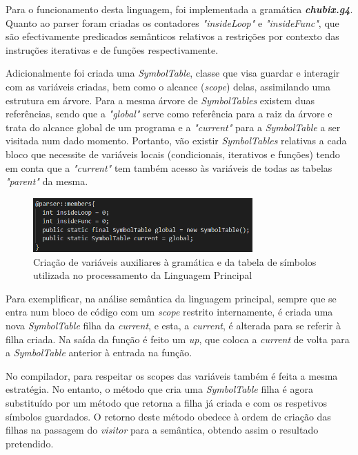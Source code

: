 \documentclass[10pt,portuguese]{article}
\begin{document}
\par Para o funcionamento desta linguagem, foi implementada a gramática \textbf{\textit{chubix.g4}}. Quanto ao parser foram criadas os contadores \emph{"insideLoop"} e \emph{"insideFunc"}, que são efectivamente predicados semânticos relativos a restrições por contexto das instruções iterativas e de funções respectivamente.
\par Adicionalmente foi criada uma \emph{SymbolTable}, classe que visa guardar e interagir com as variáveis criadas, bem como o alcance (\emph{scope}) delas, assimilando uma estrutura em árvore. Para a mesma árvore de \emph{SymbolTables} existem duas referências, sendo que a \emph{"global"} serve como referência para a raiz da árvore e trata do alcance global de um programa e a \emph{"current"} para a \emph{SymbolTable} a ser visitada num dado momento. Portanto, vão existir \emph{SymbolTables} relativas a cada bloco que necessite de variáveis locais (condicionais, iterativos e funções) tendo em conta que a \emph{"current"} tem também acesso às variáveis de todas as tabelas \emph{"parent"} da mesma.
\begin{figure}[h]
\centering
\includegraphics[width=0.75\textwidth]{images/parserchubix.png}
\caption{Criação de variáveis auxiliares à gramática e da tabela de símbolos utilizada no processamento da Linguagem Principal}
\end{figure}
\par Para exemplificar, na análise semântica da linguagem principal, sempre que se entra num bloco de código com um \emph{scope} restrito internamente, é criada uma nova \emph{SymbolTable} filha da \emph{current}, e esta, a \emph{current}, é alterada para se referir à filha criada. Na saída da função é feito um \emph{up}, que coloca a \emph{current} de volta para a \emph{SymbolTable} anterior à entrada na função.
\par No compilador, para respeitar os scopes das variáveis também é feita a mesma estratégia. No entanto, o método que cria uma \emph{SymbolTable} filha é agora substituído por um método que retorna a filha já criada e com os respetivos símbolos guardados. O retorno deste método obedece à ordem de criação das filhas na passagem do \emph{visitor} para a semântica, obtendo assim o resultado pretendido.
\end{document}
